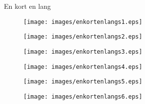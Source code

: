 \begin{sang}{En kort en lang}{}
	
\end{sang}
\begin{figure}[h!]
  \centering
    \texttt{[image: images/enkortenlangs1.eps]}
\end{figure}
\newpage
\begin{figure}[h!]
  \centering
    \texttt{[image: images/enkortenlangs2.eps]}
\end{figure}
\newpage
\begin{figure}[h!]
  \centering
    \texttt{[image: images/enkortenlangs3.eps]}
\end{figure}
\newpage
\begin{figure}[h!]
  \centering
    \texttt{[image: images/enkortenlangs4.eps]}
\end{figure}
\newpage
\begin{figure}[h!]
  \centering
    \texttt{[image: images/enkortenlangs5.eps]}
\end{figure}
\newpage
\begin{figure}[h!]
  \centering
    \texttt{[image: images/enkortenlangs6.eps]}
\end{figure}
